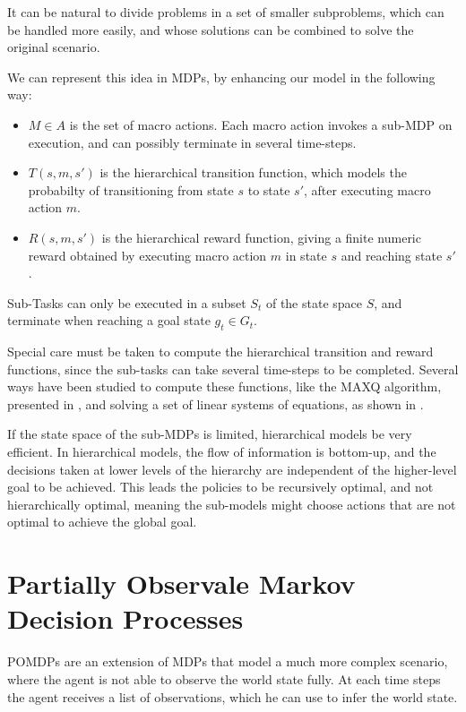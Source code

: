 It can be natural to divide problems in a set of smaller subproblems, which can be handled more easily, and whose solutions can be combined to solve the original scenario. 

We can represent this idea in MDPs, by enhancing our model in the following way:
\begin{itemize}
\item $M \in A$ is the set of macro actions. Each macro action invokes a sub-MDP on execution, and can possibly terminate in several time-steps.
\item  $T(s,m,s')$ is the hierarchical transition function, which models the probabilty of transitioning from state $s$ to state $s'$, after executing macro action $m$.
\item $R(s,m,s')$ is the hierarchical reward function, giving a finite numeric reward obtained by executing macro action $m$ in state $s$ and reaching state $s'$.
\end{itemize}

Sub-Tasks can only be executed in a subset $S_t$ of the state space $S$, and terminate when reaching a goal state $g_t \in G_t$.

Special care must be taken to compute the hierarchical transition and reward functions, since the sub-tasks can take several time-steps to be completed. Several ways have been studied to compute these functions, like the MAXQ algorithm, presented in \cite{dietterich2000hierarchical}, and solving a set of linear systems of equations, as shown in \cite{hauskrecht1998hierarchical}.

If the state space of the sub-MDPs is limited, hierarchical models be very efficient. In hierarchical models, the flow of information is bottom-up, and the decisions taken at lower levels of the hierarchy are independent of the higher-level goal to be achieved. This leads the policies to be recursively optimal, and not hierarchically optimal, meaning the sub-models might choose actions that are not optimal to achieve the global goal.

\section{Partially Observale Markov Decision Processes}
\label{sec:methods-pomdp}


POMDPs are an extension of MDPs that model a much more complex scenario, where the agent is not able to observe the world state fully. At each time steps the agent receives a list of observations, which he can use to infer the world state.

